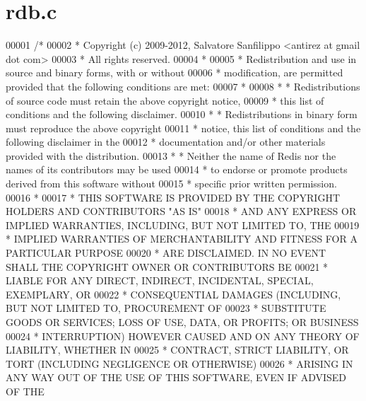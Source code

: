 \hypertarget{rdb_8c_source}{}\section{rdb.\+c}
\label{rdb_8c_source}

\begin{DoxyCode}
00001 \textcolor{comment}{/*}
00002 \textcolor{comment}{ * Copyright (c) 2009-2012, Salvatore Sanfilippo <antirez at gmail dot com>}
00003 \textcolor{comment}{ * All rights reserved.}
00004 \textcolor{comment}{ *}
00005 \textcolor{comment}{ * Redistribution and use in source and binary forms, with or without}
00006 \textcolor{comment}{ * modification, are permitted provided that the following conditions are met:}
00007 \textcolor{comment}{ *}
00008 \textcolor{comment}{ *   * Redistributions of source code must retain the above copyright notice,}
00009 \textcolor{comment}{ *     this list of conditions and the following disclaimer.}
00010 \textcolor{comment}{ *   * Redistributions in binary form must reproduce the above copyright}
00011 \textcolor{comment}{ *     notice, this list of conditions and the following disclaimer in the}
00012 \textcolor{comment}{ *     documentation and/or other materials provided with the distribution.}
00013 \textcolor{comment}{ *   * Neither the name of Redis nor the names of its contributors may be used}
00014 \textcolor{comment}{ *     to endorse or promote products derived from this software without}
00015 \textcolor{comment}{ *     specific prior written permission.}
00016 \textcolor{comment}{ *}
00017 \textcolor{comment}{ * THIS SOFTWARE IS PROVIDED BY THE COPYRIGHT HOLDERS AND CONTRIBUTORS "AS IS"}
00018 \textcolor{comment}{ * AND ANY EXPRESS OR IMPLIED WARRANTIES, INCLUDING, BUT NOT LIMITED TO, THE}
00019 \textcolor{comment}{ * IMPLIED WARRANTIES OF MERCHANTABILITY AND FITNESS FOR A PARTICULAR PURPOSE}
00020 \textcolor{comment}{ * ARE DISCLAIMED. IN NO EVENT SHALL THE COPYRIGHT OWNER OR CONTRIBUTORS BE}
00021 \textcolor{comment}{ * LIABLE FOR ANY DIRECT, INDIRECT, INCIDENTAL, SPECIAL, EXEMPLARY, OR}
00022 \textcolor{comment}{ * CONSEQUENTIAL DAMAGES (INCLUDING, BUT NOT LIMITED TO, PROCUREMENT OF}
00023 \textcolor{comment}{ * SUBSTITUTE GOODS OR SERVICES; LOSS OF USE, DATA, OR PROFITS; OR BUSINESS}
00024 \textcolor{comment}{ * INTERRUPTION) HOWEVER CAUSED AND ON ANY THEORY OF LIABILITY, WHETHER IN}
00025 \textcolor{comment}{ * CONTRACT, STRICT LIABILITY, OR TORT (INCLUDING NEGLIGENCE OR OTHERWISE)}
00026 \textcolor{comment}{ * ARISING IN ANY WAY OUT OF THE USE OF THIS SOFTWARE, EVEN IF ADVISED OF THE}

\end{DoxyCode}
